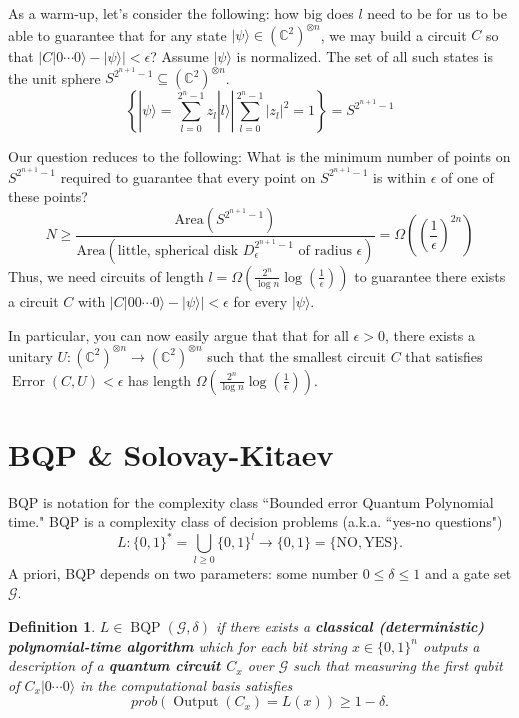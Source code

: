 \documentclass{article}
\newtheorem*{dfn}{Definition}
\newcommand{\ket}[1]{|#1\rangle}
\newcommand{\bbC}{\mathbb{C}}
\newcommand{\calG}{\mathcal{G}}
\newcommand{\qbit}{\bbC^2}
\newcommand{\qbits}[1]{(\qbit)^{\otimes #1}}
\begin{document}
As a warm-up, let's consider the following: how big does \(l\) need to be for us to be able to guarantee that for any state $\ket{\psi} \in \qbits{n}$, we may build a circuit \(C\) so that \(|C \ket{0\dotsb0} - \ket{\psi}| < \epsilon\)? Assume \(\ket{\psi}\) is normalized. The set of all such states is the unit sphere \(S^{2^{n+1}-1} \subseteq (\bbC^2)^{\otimes n}\).
\[ \left\{\left. \ket{\psi} = \sum_{l=0}^{2^n -1} z_l \ket{l} \right| \sum_{l=0}^{2^n -1} |z_l|^2 = 1 \right\} = S^{2^{n+1}-1} \]

Our question reduces to the following: What is the minimum number of points on \(S^{2^{n+1}-1}\) required to guarantee that every point on \(S^{2^{n+1}-1}\) is within \(\epsilon\) of one of these points?
\[ N \geq \frac{\text{Area}(S^{2^{n+1}-1})}{\text{Area}(\text{little, spherical disk \(D^{2^{n+1}-1}_{\epsilon}\) of radius \(\epsilon\)})} = \Omega\left(\left(\frac{1}{\epsilon}\right)^{2n}\right) \]
Thus, we need circuits of length \(l = \Omega\left(\frac{2^n}{\log n} \log \left(\frac{1}{\epsilon}\right)\right)\) to guarantee there exists a circuit \(C\) with \(|C\ket{00\dotsb0} - \ket{\psi}| < \epsilon\) for every \(\ket{\psi}\).

In particular, you can now easily argue that that for all \( \epsilon > 0 \), there exists a unitary \(U : (\bbC^2)^{\otimes n} \to (\bbC^2)^{\otimes n}\) such that the smallest circuit \(C\) that satisfies \(\operatorname{Error}(C, U) < \epsilon\) has length \(\Omega\left(\frac{2^n}{\log n} \log \left(\frac{1}{\epsilon}\right)\right)\).

\section{BQP \& Solovay-Kitaev}
BQP is notation for the complexity class ``Bounded error Quantum Polynomial time."
BQP is a complexity class of decision problems (a.k.a. ``yes-no questions") \[L : \{0,1\}^* = \bigcup_{l \ge 0} \{0,1\}^l \to \{0,1\} = \{\text{NO}, \text{YES}\}.\]
A priori, BQP depends on two parameters: some number \(0 \leq \delta \leq 1\) and a gate set \(\calG\).

\begin{dfn}
	\(L \in \operatorname{BQP}(\calG, \delta)\) if there exists a \textbf{classical (deterministic) polynomial-time algorithm} which for each bit string \(x \in \{0,1\}^n\) outputs a description of a \textbf{quantum circuit \(C_x\)} over $\calG$ such that measuring the first qubit of \(C_x\ket{0\cdots 0}\) in the computational basis satisfies \[prob(\operatorname{Output}(C_x) = L(x)) \ge 1 - \delta.\]
\end{dfn}
\end{document}
